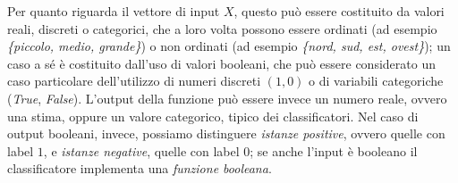 \documentclass[oneside, openany]{book}
\begin{document}
		Per quanto riguarda il vettore di input $X$, questo può essere costituito da valori reali, discreti o categorici, che a loro volta possono essere ordinati (ad esempio \textit{\{piccolo, medio, grande\}}) o non ordinati (ad esempio \textit{\{nord, sud, est, ovest\}}); un caso a sé è costituito dall'uso di valori booleani, che può essere considerato un caso particolare dell'utilizzo di numeri discreti $(1,0)$ o di variabili categoriche (\textit{True}, \textit{False}).\newline
		L'output della funzione può essere invece un numero reale, ovvero una stima, oppure un valore categorico, tipico dei classificatori. Nel caso di output booleani, invece, possiamo distinguere \textit{istanze positive}, ovvero quelle con label $1$, e \textit{istanze negative}, quelle con label $0$; se anche l'input è booleano il classificatore implementa una \textit{funzione booleana}.\\
		
\end{document}
